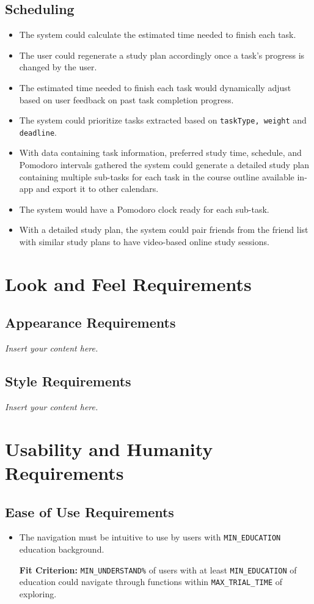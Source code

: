 \documentclass[12pt]{article}
\newcommand{\lips}{\textit{Insert your content here.}}
\newcounter{reqnum} %
\newcommand{\rthereqnum}{FR\refstepcounter{reqnum}\thereqnum:}
\newcounter{nfrnum} %
\newcommand{\rthenfrnum}{NFR\refstepcounter{nfrnum}\thenfrnum:}
\begin{document}
\subsection{Scheduling}
\begin{itemize}
\item[\rthereqnum]
The system could calculate the estimated time needed to finish each task. 
\item[\rthereqnum]
The user could regenerate a study plan accordingly once a task's progress is changed by the user.
\item[\rthereqnum]
The estimated time needed to finish each task would dynamically adjust based on user feedback on past task completion progress.
\item[\rthereqnum]
The system could prioritize tasks extracted based on \texttt{taskType, weight} and \texttt{deadline}.
\item[\rthereqnum]
With data containing task information, preferred study time, schedule, and Pomodoro intervals gathered the system could generate a detailed study plan containing multiple sub-tasks for each task in the course outline available in-app and export it to other calendars.
\item[\rthereqnum]
The system would have a Pomodoro clock ready for each sub-task.
\item[\rthereqnum]
With a detailed study plan, the system could pair friends from the friend list with similar study plans to have video-based online study sessions.
\end{itemize}
\section{Look and Feel Requirements}
\subsection{Appearance Requirements}
\lips
\subsection{Style Requirements}
\lips

\section{Usability and Humanity Requirements}
\subsection{Ease of Use Requirements}
\begin{itemize}
\item[\rthenfrnum]The navigation must be intuitive to use by users with \texttt{MIN\_EDUCATION} education background.

\textbf{Fit Criterion:} \texttt{MIN\_UNDERSTAND\%} of users with at least \texttt{MIN\_EDUCATION} of education could navigate through functions within \texttt{MAX\_TRIAL\_TIME} of exploring.
\end{itemize}
\end{document}
